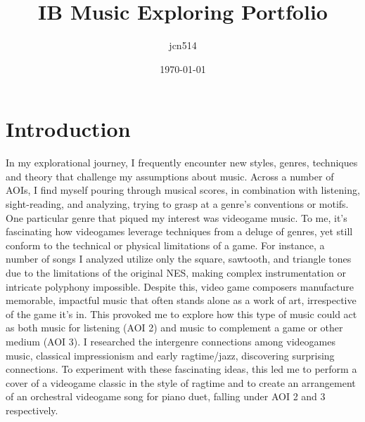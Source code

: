 \documentclass[11pt,a4paper]{article}
\author{jcn514}
\title{IB Music Exploring Portfolio}
\date{\today}
\begin{document}
\maketitle
\tableofcontents

\pagebreak

\section{Introduction}
In my explorational journey, I frequently encounter new styles, genres, techniques and theory that challenge my assumptions about music. Across a number of AOIs, I find myself pouring through musical scores, in combination with listening, sight-reading, and analyzing, trying to grasp at a genre’s conventions or motifs. One particular genre that piqued my interest was videogame music. To me, it’s fascinating how videogames leverage techniques from a deluge of genres, yet still conform to the technical or physical limitations of a game. For instance, a number of songs I analyzed utilize only the square, sawtooth, and triangle tones due to the limitations of the original NES, making complex instrumentation or intricate polyphony impossible. Despite this, video game composers manufacture memorable, impactful music that often stands alone as a work of art, irrespective of the game it's in. This provoked me to explore how this type of music could act as both music for listening (AOI 2) and music to complement a game or other medium (AOI 3). I researched the intergenre connections among videogames music, classical impressionism and early ragtime/jazz, discovering surprising connections. To experiment with these fascinating ideas, this led me to perform a cover of a videogame classic in the style of ragtime and to create an arrangement of an orchestral videogame song for piano duet, falling under AOI 2 and 3 respectively.
\end{document}
